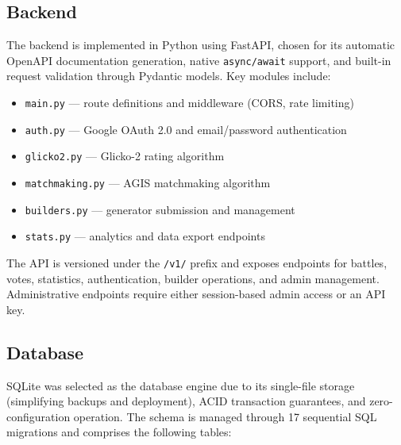 \documentclass[shortabstract, mgr, english]{iithesis}
\begin{document}
\subsection{Backend}
\label{subsec:sd-backend}

The backend is implemented in Python using FastAPI, chosen for its automatic OpenAPI
documentation generation, native \texttt{async/await} support, and built-in request
validation through Pydantic models. Key modules include:

\begin{itemize}[nosep]
    \item \texttt{main.py} --- route definitions and middleware (CORS, rate limiting)
    \item \texttt{auth.py} --- Google OAuth 2.0 and email/password authentication
    \item \texttt{glicko2.py} --- Glicko-2 rating algorithm
    \item \texttt{matchmaking.py} --- AGIS matchmaking algorithm
    \item \texttt{builders.py} --- generator submission and management
    \item \texttt{stats.py} --- analytics and data export endpoints
\end{itemize}

The API is versioned under the \texttt{/v1/} prefix and exposes endpoints for battles,
votes, statistics, authentication, builder operations, and admin management. Administrative
endpoints require either session-based admin access or an API key.

\subsection{Database}
\label{subsec:sd-database}

SQLite was selected as the database engine due to its single-file storage (simplifying
backups and deployment), ACID transaction guarantees, and zero-configuration operation.
The schema is managed through 17 sequential SQL migrations and comprises the following
tables:
\end{document}
